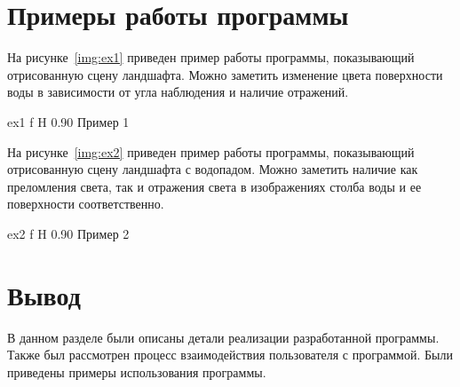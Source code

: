\section{Примеры работы программы}

На рисунке~\ref{img:ex1} приведен пример работы программы, показывающий отрисованную 
сцену ландшафта. Можно заметить изменение цвета поверхности воды в зависимости
от угла наблюдения и наличие отражений.

    {ex1}
    {f}
    {H}
    {0.90\textwidth}
    {Пример 1}

На рисунке~\ref{img:ex2} приведен пример работы программы, показывающий отрисованную сцену ландшафта
с водопадом. Можно заметить наличие как преломления света, так и отражения света 
в изображениях столба воды и ее поверхности соответственно.

    {ex2}
    {f}
    {H}
    {0.90\textwidth}
    {Пример 2}

\section*{Вывод}

В данном разделе были описаны детали реализации разработанной программы. 
Также был рассмотрен процесс взаимодействия пользователя с программой.
Были приведены примеры использования программы.
